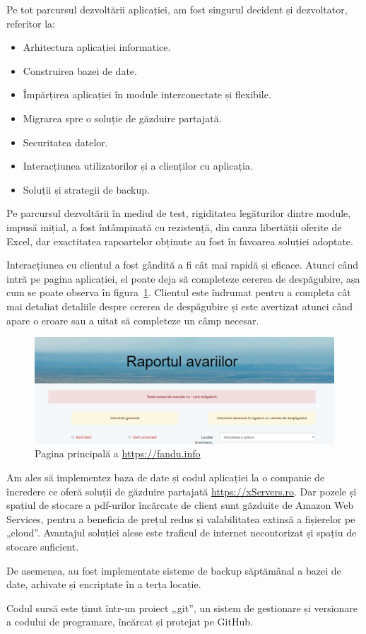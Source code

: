 	Pe tot parcursul dezvoltării aplicației, am fost singurul decident și dezvoltator, referitor la:
	\begin{itemize}
		\item Arhitectura aplicației informatice.
		\item Construirea bazei de date.
		\item Împărțirea aplicației în module interconectate și flexibile.
		\item Migrarea spre o soluție de găzduire partajată.
		\item Securitatea datelor.
		\item Interacțiunea utilizatorilor și a clienților cu aplicația.
		\item Soluții și strategii de backup.
	\end{itemize}

	Pe parcursul dezvoltării în mediul de test, rigiditatea legăturilor dintre module, impusă inițial, a fost întâmpinată cu rezistență, din cauza libertății oferite de Excel, dar exactitatea rapoartelor obținute au fost în favoarea soluției adoptate.

	Interacțiunea cu clientul a fost gândită a fi cât mai rapidă și eficace.
	Atunci când intră pe pagina aplicației, el poate deja să completeze cererea de despăgubire, așa cum se poate observa în figura~\ref{fig:pagina_principala}.
	Clientul este îndrumat pentru a completa cât mai detaliat detaliile despre cererea de despăgubire și este avertizat atunci când apare o eroare sau a uitat să completeze un câmp necesar.
	\begin{figure}
	\includegraphics[width=\linewidth]{../imagini/main.png}
	\caption{Pagina principală a \url{https://fandu.info}}
	\label{fig:pagina_principala}
	\end{figure}

	Am ales să implementez baza de date și codul aplicației la o companie de încredere ce oferă soluții de găzduire partajată \url{https://xServers.ro}\cite{xservers}.
	Dar pozele și spațiul de stocare a pdf-urilor încărcate de client sunt găzduite de Amazon Web Services\cite{aws}, pentru a beneficia de prețul redus și valabilitatea extinsă a fișierelor pe „cloud”.
	Avantajul soluției alese este traficul de internet necontorizat și spațiu de stocare suficient.

	De asemenea, au fost implementate sisteme de backup săptămânal a bazei de date, arhivate și encriptate în a terța locație.

	Codul sursă este ținut într-un proiect „git”, un sistem de gestionare și versionare a codului de programare, încărcat și protejat pe GitHub.
